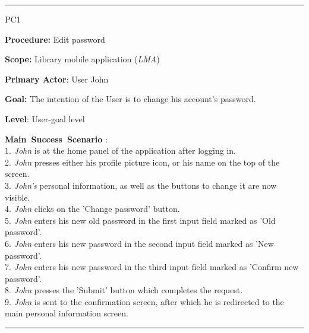 \vspace{0.5cm}
\hrule
\begin{lyxlist}{PC1}
\small{
\item [\textbf{Procedure:}] Edit password
\item [\textbf{Scope:}] Library mobile application (\emph{LMA})
\item [\textbf{Primary Actor}:] User John
\item [\textbf{Goal:}] The intention of the User is to change his account's
password.
\item [\textbf{Level}:] User-goal level
\item [\textbf{Main~Success~Scenario}]:\\
1. \emph{John} is at the home panel of the application after logging in.\\
2. \emph{John} presses either his profile picture icon, or his name on the
top of the screen.\\
3. \emph{John's} personal information, as well as the buttons to change it are
now visible.\\
4. \emph{John} clicks on the 'Change password' button.\\
5. \emph{John} enters his new old password in the first input field marked as
'Old password'. \\
6. \emph{John} enters his new password in the second input field marked as 'New
password'.
\\
7. \emph{John} enters his new password in the third input field marked as
'Confirm new password'.
\\
8. \emph{John} presses the 'Submit' button which completes the request.  \\
9. \emph{John} is sent to the confirmation screen, after which he is redirected
to the main personal information screen. \\

}

\end{lyxlist}
\hrule


